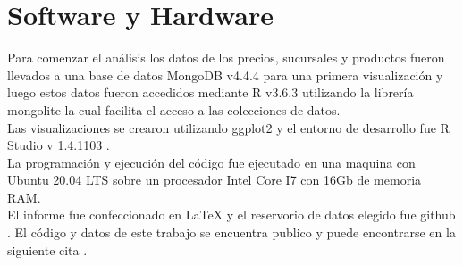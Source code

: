 \section{Software y Hardware}
Para comenzar el análisis los datos de los precios, sucursales y productos fueron llevados a una base de datos MongoDB v4.4.4\cite{mongodb} para una primera visualización y luego estos datos fueron accedidos mediante R v3.6.3 \cite{R} utilizando la librería mongolite \cite{mongolite} la cual facilita el acceso a las colecciones de datos.\\
Las visualizaciones se crearon utilizando ggplot2 \cite{ggplot2} y el entorno de desarrollo fue R Studio v 1.4.1103 \cite{rstudio}.\\
La programación y ejecución del código fue ejecutado en una maquina con Ubuntu 20.04 LTS sobre un procesador Intel Core I7 con 16Gb de memoria RAM.\\
El informe fue confeccionado en LaTeX \cite{latex} y el reservorio de datos elegido fue github \cite{github}.
El código y datos de este trabajo se encuentra publico y puede encontrarse en la siguiente cita \cite{repo_mio}.